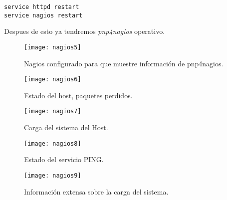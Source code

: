 \documentclass[a4paper, 10pt]{article} %
\begin{document}
\begin{verbatim}
service httpd restart
service nagios restart
\end{verbatim}
Despues de esto ya tendremos \textit{pnp4nagios} operativo.
\begin{figure}[H]
\centering 
\texttt{[image: nagios5]} 
\caption{Nagios configurado para que muestre información de pnp4nagios.} 
\label{contexto:figura} 
\end{figure}
\begin{figure}[H]
\centering 
\texttt{[image: nagios6]} 
\caption{Estado del host, paquetes perdidos.} 
\label{contexto:figura} 
\end{figure}
\begin{figure}[H]
\centering 
\texttt{[image: nagios7]} 
\caption{Carga del sistema del Host.} 
\label{contexto:figura} 
\end{figure}
\begin{figure}[H]
\centering 
\texttt{[image: nagios8]} 
\caption{Estado del servicio PING.} 
\label{contexto:figura} 
\end{figure}
\begin{figure}[H]
\centering 
\texttt{[image: nagios9]} 
\caption{Información extensa sobre la carga del sistema.} 
\label{contexto:figura} 
\end{figure}
\end{document}

